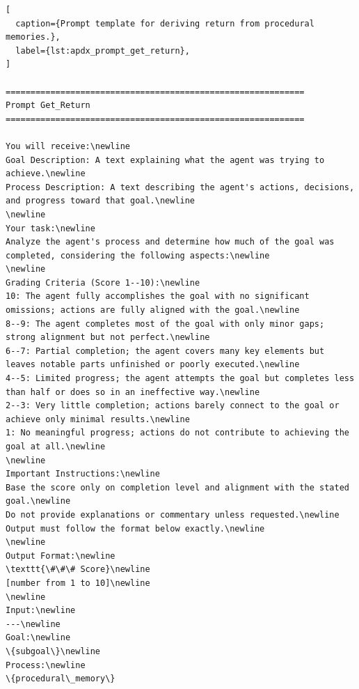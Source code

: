 \begin{lstlisting}[
  caption={Prompt template for deriving return from procedural memories.},
  label={lst:apdx_prompt_get_return},
]

============================================================
Prompt Get_Return
============================================================

You will receive:\newline
Goal Description: A text explaining what the agent was trying to achieve.\newline
Process Description: A text describing the agent's actions, decisions, and progress toward that goal.\newline
\newline
Your task:\newline
Analyze the agent's process and determine how much of the goal was completed, considering the following aspects:\newline
\newline
Grading Criteria (Score 1--10):\newline
10: The agent fully accomplishes the goal with no significant omissions; actions are fully aligned with the goal.\newline
8--9: The agent completes most of the goal with only minor gaps; strong alignment but not perfect.\newline
6--7: Partial completion; the agent covers many key elements but leaves notable parts unfinished or poorly executed.\newline
4--5: Limited progress; the agent attempts the goal but completes less than half or does so in an ineffective way.\newline
2--3: Very little completion; actions barely connect to the goal or achieve only minimal results.\newline
1: No meaningful progress; actions do not contribute to achieving the goal at all.\newline
\newline
Important Instructions:\newline
Base the score only on completion level and alignment with the stated goal.\newline
Do not provide explanations or commentary unless requested.\newline
Output must follow the format below exactly.\newline
\newline
Output Format:\newline
\texttt{\#\#\# Score}\newline
[number from 1 to 10]\newline
\newline
Input:\newline
---\newline
Goal:\newline
\{subgoal\}\newline
Process:\newline
\{procedural\_memory\}

\end{lstlisting}